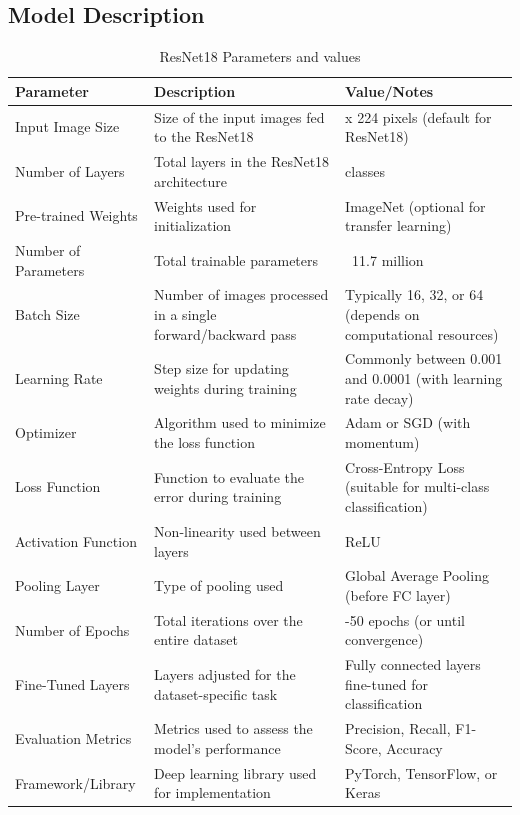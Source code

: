 \documentclass[conference]{IEEEtran}
\renewcommand{\arraystretch}{1.5}
\begin{document}
\subsection{\textbf{Model Description}}
\begin{table}[h]
\caption{ResNet18 Parameters and values}
    \centering
    \renewcommand{\arraystretch}{1.5}  %
    \begin{tabular}{|>{\centering\arraybackslash}p{2cm}|>{\centering\arraybackslash}p{3cm}|>{\centering\arraybackslash}p{2.5cm}|}
    \hline
    \textbf{Parameter} & \textbf{Description} & \textbf{Value/Notes} \\ \hline
    Input Image Size & Size of the input images fed to the ResNet18 & 224 x 224 pixels (default for ResNet18) \\ \hline
    Number of Layers & Total layers in the ResNet18 architecture & 18 classes \\ \hline
    Pre-trained Weights & Weights used for initialization & ImageNet (optional for transfer learning) \\ \hline
    Number of Parameters & Total trainable parameters & ~11.7 million \\ \hline
    Batch Size & Number of images processed in a single forward/backward pass & Typically 16, 32, or 64 (depends on computational resources) \\ \hline
    Learning Rate & Step size for updating weights during training & Commonly between 0.001 and 0.0001 (with learning rate decay) \\ \hline
    Optimizer & Algorithm used to minimize the loss function & Adam or SGD (with momentum) \\ \hline
    Loss Function & Function to evaluate the error during training & Cross-Entropy Loss (suitable for multi-class classification) \\ \hline
    Activation Function & Non-linearity used between layers & ReLU \\ \hline
    Pooling Layer & Type of pooling used & Global Average Pooling (before FC layer) \\ \hline
    Number of Epochs & Total iterations over the entire dataset & 20-50 epochs (or until convergence) \\ \hline
    Fine-Tuned Layers & Layers adjusted for the dataset-specific task & Fully connected layers fine-tuned for classification \\ \hline
                               Evaluation Metrics & Metrics used to assess the model’s performance & Precision, Recall, F1-Score, Accuracy \\ \hline
    Framework/Library & Deep learning library used for implementation & PyTorch, TensorFlow, or Keras \\ \hline
    \end{tabular}
    \label{tab:cnn_parameters}
\end{table}
\end{document}
